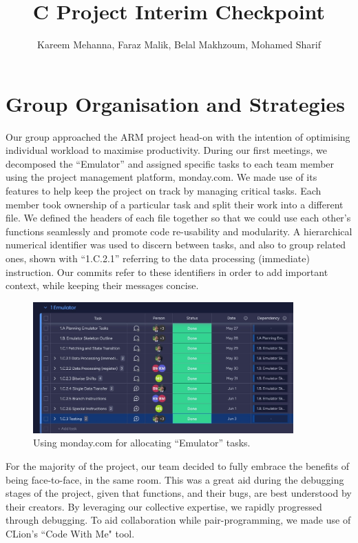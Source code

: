 \documentclass[11pt]{article}
\begin{document}
\title{C Project Interim Checkpoint}
\author{Kareem Mehanna, Faraz Malik, Belal Makhzoum, Mohamed Sharif}

\maketitle

\section{Group Organisation and Strategies}

Our group approached the ARM project head-on with the intention of optimising individual workload to maximise productivity. During our first meetings, we decomposed the “Emulator” and assigned specific tasks to each team member using the project management platform, monday.com. We made use of its features to help keep the project on track by managing critical tasks. Each member took ownership of a particular task and split their work into a different file. We defined the headers of each file together so that we could use each other's functions seamlessly and promote code re-usability and modularity. A hierarchical numerical identifier was used to discern between tasks, and also to group related ones, shown with “1.C.2.1” referring to the data processing (immediate) instruction. Our commits refer to these identifiers in order to add important context, while keeping their messages concise. \\
\begin{figure}
\centering
    \includegraphics[scale=0.5,width=10cm]{Monday.Com}
    \caption{Using monday.com for allocating “Emulator” tasks.}
\end{figure}

For the majority of the project, our team decided to fully embrace the benefits of being face-to-face, in the same room. This was a great aid during the debugging stages of the project, given that functions, and their bugs, are best understood by their creators. By leveraging our collective expertise, we rapidly progressed through debugging. To aid collaboration while pair-programming, we made use of CLion's “Code With Me" tool. \\
\end{document}
